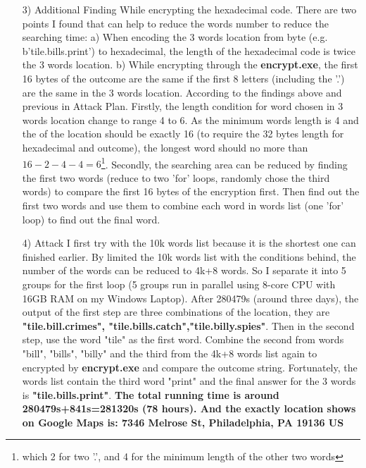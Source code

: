 \documentclass[11pt, a4paper, margin 2cm]{report}
\begin{document}
\begin{enumerate}
\normalsize\item[3)]{Additional Finding}
\newline\normalsize\indent\setlength{\parindent}{2em}While encrypting the hexadecimal code. There are two points I found that can help to reduce the words number to reduce the searching time: a) When encoding the 3 words location from byte (e.g. b'tile.bills.print') to hexadecimal, the length of the hexadecimal code is twice the 3 words location. b) While encrypting through the \textbf{encrypt.exe}, the first 16 bytes of the outcome are the same if the first 8 letters (including the '.') are the same in the 3 words location. \newline\normalsize\indent\setlength{\parindent}{2em}According to the findings above and previous in Attack Plan. Firstly, the length condition for word chosen in 3 words location change to range 4 to 6. As the minimum words length is 4 and the  of the location should be exactly 16 (to require the 32 bytes length for hexadecimal and outcome), the longest word should no more than $16-2-4-4=6$\footnote{which 2 for two '.', and 4 for the minimum length of the other two words}. Secondly, the searching area can be reduced by finding the first two words (reduce to two 'for' loops, randomly chose the third words) to compare the first 16 bytes of the encryption first. Then find out the first two words and use them to combine each word in words list (one 'for' loop) to find out the final word.

\normalsize\item[4)]{Attack}
\newline\normalsize\indent\setlength{\parindent}{2em}I first try with the 10k words list because it is the shortest one can finished earlier. By limited the 10k words list with the conditions behind, the number of the words can be reduced to 4k+8 words. So I separate it into 5 groups for the first loop (5 groups run in parallel using 8-core CPU with 16GB RAM on my Windows Laptop). After 280479s (around three days), the output of the first step are three combinations of the location, they are \textbf{"tile.bill.crimes", "tile.bills.catch","tile.billy.spies"}. \newline Then in the second step, use the word "tile" as the first word. Combine the second from words "bill", "bills", "billy" and the third from the 4k+8 words list again to encrypted by \textbf{encrypt.exe} and compare the outcome string. Fortunately, the words list contain the third word "print" and the final answer for the 3 words is \textbf{"tile.bills.print"}.
\newline\textbf{The total running time is around 280479s+841s=281320s (78 hours). And the exactly location shows on Google Maps is: 7346 Melrose St, Philadelphia, PA 19136 US}
\end{enumerate}
\end{document}
